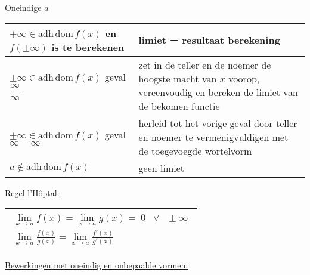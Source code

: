 \documentclass[a5paper]{article}
\begin{document}
Oneindige \( a \) \newline
\begin{tabularx}{\textwidth}{|>{\centering\arraybackslash}m{4.5cm}|X|}
\hline
\( \pm \infty \in \mathrm{adh} \, \mathrm{dom} \, f(x) \) en \( f(\pm \infty) \) is te berekenen 
& limiet = resultaat berekening \\
\hline
\( \pm \infty \in \mathrm{adh} \, \mathrm{dom} \, f(x) \) \newline geval \( \dfrac{\infty}{\infty} \) 
& zet in de teller en de noemer de hoogste macht van \( x \) voorop, vereenvoudig en bereken de limiet van de bekomen functie \\
\hline
\( \pm \infty \in \mathrm{adh} \, \mathrm{dom} \, f(x) \) \newline geval \( \infty - \infty \)
& herleid tot het vorige geval door teller en noemer te vermenigvuldigen met de toegevoegde wortelvorm \\
\hline
\( a \notin \mathrm{adh} \, \mathrm{dom} \, f(x) \) 
& geen limiet \\
\hline
\end{tabularx}
\par\vspace{0.3cm}
% 
%
\underline{Regel l’Hôptal:} \newline
\begin{tabularx}{\textwidth}{|X|}
\hline
$\begin{array}{l}
\mathop {\lim }\limits_{x \to a} f\left( x \right) = \mathop {\lim }\limits_{x \to a} g\left( x \right) = \;0\;\; \vee \;\; \pm \infty \\
\mathop {\lim }\limits_{x \to a} \frac{{f\left( x \right)}}{{g\left( x \right)}} = \mathop {\lim }\limits_{x \to a} \frac{{f'\left( x \right)}}{{g'\left( x \right)}}
\end{array}$ \\
\hline
\end{tabularx}

\newpage

\par\vspace{0.3cm}
\underline{Bewerkingen met oneindig en onbepaalde vormen:} \newline
\end{document}

